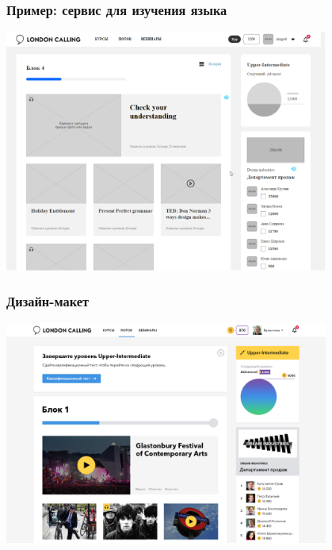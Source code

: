 \documentclass{../../slides-style}
\begin{document}
    \begin{frame}
        \frametitle{Пример: сервис для изучения языка}
        \begin{center}
            \includegraphics[width=0.8\textwidth]{languageServiceWireframe.png}
        \end{center}
    \end{frame}

    \begin{frame}
        \frametitle{Дизайн-макет}
        \begin{center}
            \includegraphics[width=0.8\textwidth]{designLayout.png}
        \end{center}
    \end{frame}
\end{document}
